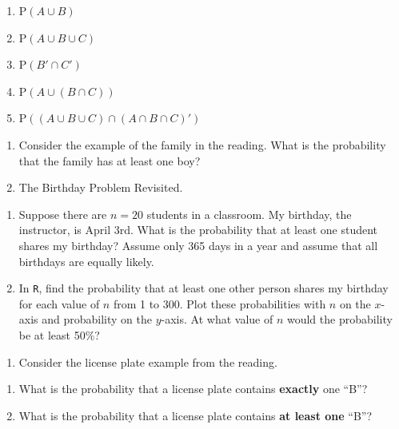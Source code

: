 \documentclass[
  letterpaper,
  DIV=11,
  numbers=noendperiod]{scrreprt}
\providecommand{\tightlist}{%
  \setlength{\itemsep}{0pt}\setlength{\parskip}{0pt}}\usepackage{longtable,booktabs,array}
\begin{document}
\begin{enumerate}
\def\labelenumi{\alph{enumi}.}
\tightlist
\item
  \(\mbox{P}(A\cup B)\)\\
\item
  \(\mbox{P}(A\cup B \cup C)\)\\
\item
  \(\mbox{P}(B'\cap C')\)\\
\item
  \(\mbox{P}(A\cup (B\cap C))\)\\
\item
  \(\mbox{P}((A\cup B \cup C)\cap (A\cap B \cap C)')\)
\end{enumerate}

\begin{enumerate}
\def\labelenumi{\arabic{enumi}.}
\setcounter{enumi}{1}
\item
  Consider the example of the family in the reading. What is the
  probability that the family has at least one boy?
\item
  The Birthday Problem Revisited.
\end{enumerate}

\begin{enumerate}
\def\labelenumi{\alph{enumi}.}
\tightlist
\item
  Suppose there are \(n=20\) students in a classroom. My birthday, the
  instructor, is April 3rd. What is the probability that at least one
  student shares my birthday? Assume only 365 days in a year and assume
  that all birthdays are equally likely.\\
\item
  In \texttt{R}, find the probability that at least one other person
  shares my birthday for each value of \(n\) from 1 to 300. Plot these
  probabilities with \(n\) on the \(x\)-axis and probability on the
  \(y\)-axis. At what value of \(n\) would the probability be at least
  50\%?
\end{enumerate}

\begin{enumerate}
\def\labelenumi{\arabic{enumi}.}
\setcounter{enumi}{3}
\tightlist
\item
  Consider the license plate example from the reading.
\end{enumerate}

\begin{enumerate}
\def\labelenumi{\alph{enumi}.}
\tightlist
\item
  What is the probability that a license plate contains \textbf{exactly}
  one ``B''?\\
\item
  What is the probability that a license plate contains \textbf{at least
  one} ``B''?
\end{enumerate}
\end{document}

